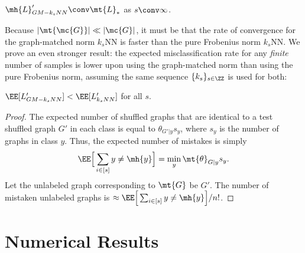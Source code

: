 \documentclass[10pt,journal,cspaper,compsoc]{IEEEtran}
\begin{document}
\begin{coro}
	$\mh{L}_{GM-k_sNN}' \conv \mt{L}_*$ as $s \conv \infty$.
\end{coro}
Because $|\mt{\mc{G}}| \ll |\mc{G}|$, it must be that the rate of convergence for the graph-matched norm $k_s$NN is faster than the pure Frobenius norm $k_s$NN. We prove an even stronger result: the expected misclassification rate for any \emph{finite} number of samples is lower upon using the graph-matched norm than using the pure Frobenius norm, assuming the same sequence $\{k_s\}_{s \in \ZZ}$ is used for both: 
\begin{thm} \label{thm:7}
	$\EE[L_{GM-k_sNN}'] < \EE[L_{k_sNN}']$ for all $s$.
\end{thm}
\begin{proof}
	The expected number of shuffled graphs that are identical to a test shuffled graph $G'$ in each class is equal to $\theta_{G'|y} s_y$, where $s_y$ is the number of graphs in class $y$.  Thus, the expected number of mistakes is simply 
\begin{align}
	\EE\Big[\sum_{i \in [s]} y \neq \mh{y}\Big]=\min_y \mt{\theta}_{G|y} s_y.
\end{align}  
Let the unlabeled graph corresponding to $\mt{G}$ be $G'$.  The number of mistaken unlabeled graphs is  $\approx \EE\Big[\sum_{i \in [s]} y \neq \mh{y}\Big]/n!$.	
\end{proof}





\section{Numerical Results} %
\label{sec:simulated_experiment}
\end{document}
